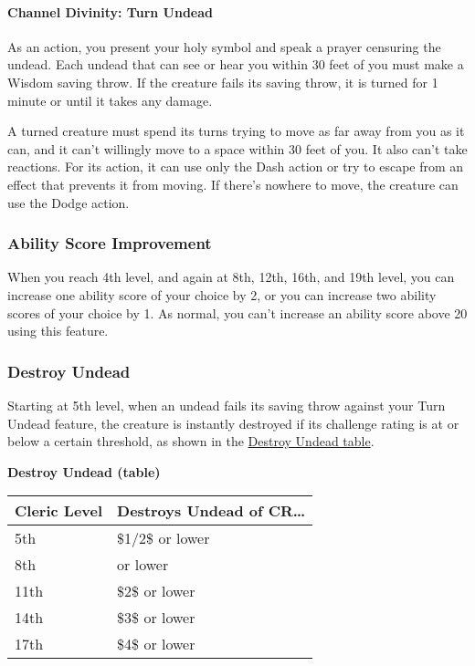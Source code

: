 \paragraph{Channel Divinity: Turn
Undead}\label{Cleric_channel-divinity-turn-undead}

As an action, you present your holy symbol and speak a prayer censuring
the undead. Each undead that can see or hear you within 30 feet of you
must make a Wisdom saving throw. If the creature fails its saving throw,
it is turned for 1 minute or until it takes any damage.

A turned creature must spend its turns trying to move as far away from
you as it can, and it can't willingly move to a space within 30 feet of
you. It also can't take reactions. For its action, it can use only the
Dash action or try to escape from an effect that prevents it from
moving. If there's nowhere to move, the creature can use the Dodge
action.

\subsubsection{Ability Score
Improvement}\label{Cleric_ability-score-improvement}

When you reach 4th level, and again at 8th, 12th, 16th, and 19th level,
you can increase one ability score of your choice by 2, or you can
increase two ability scores of your choice by 1. As normal, you can't
increase an ability score above 20 using this feature.

\subsubsection{Destroy Undead}\label{Cleric_destroy-undead}

Starting at 5th level, when an undead fails its saving throw against
your Turn Undead feature, the creature is instantly destroyed if its
challenge rating is at or below a certain threshold, as shown in the
\hyperref[cleric-feature-destroy-undead-table]{Destroy Undead table}.

\textbf{Destroy Undead (table)}

\begin{longtable}[]{@{}
  >{\raggedright\arraybackslash}p{}
  >{\raggedright\arraybackslash}p{}@{}}
\toprule\noalign{}
\begin{minipage}[b]{\linewidth}\raggedright
Cleric Level
\end{minipage} & \begin{minipage}[b]{\linewidth}\raggedright
Destroys Undead of CR\ldots\hspace{0pt}
\end{minipage} \\
\midrule\noalign{}
\endhead
\bottomrule\noalign{}
\endlastfoot
5th & \$1/2\$ or lower \\
8th & 1 or lower \\
11th & \$2\$ or lower \\
14th & \$3\$ or lower \\
17th & \$4\$ or lower \\
\end{longtable}

